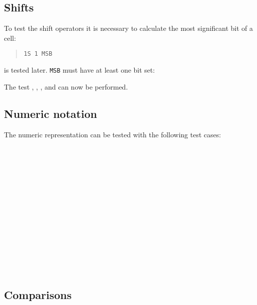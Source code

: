 \subsection{Shifts}

To test the shift operators it is necessary to calculate the most
significant bit of a cell:

\begin{quote}
	\texttt{1S 1    MSB}
\end{quote}

 is tested later.
\texttt{MSB} must have at least one bit set:

\begin{quote}
\end{quote}

The test , ,
, and 
can now be performed.

\subsection{Numeric notation}%
\label{test:numeric}

The numeric representation can be tested with the following test cases:

\begin{tt}
	 \\
	 \\
	 \\
	 \\
	 \\
	 \\
	 \\
	 \\
	 \\
	 \\
	 \\
	 \\
	 \\
\end{tt}

\subsection{Comparisons}

